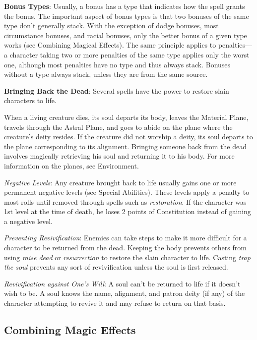 \textbf{Bonus Types}: Usually, a bonus has a type that indicates how the spell grants the bonus. The important aspect of bonus types is that two bonuses of the same type don't generally stack. With the exception of dodge bonuses, most circumstance bonuses, and racial bonuses, only the better bonus of a given type works (see Combining Magical Effects). The same principle applies to penalties---a character taking two or more penalties of the same type applies only the worst one, although most penalties have no type and thus always stack. Bonuses without a type always stack, unless they are from the same source.
				
\textbf{Bringing Back the Dead}: Several spells have the power to restore slain characters to life.
				
When a living creature dies, its soul departs its body, leaves the Material Plane, travels through the Astral Plane, and goes to abide on the plane where the creature's deity resides. If the creature did not worship a deity, its soul departs to the plane corresponding to its alignment. Bringing someone back from the dead involves magically retrieving his soul and returning it to his body. For more information on the planes, see Environment.
				
\textit{Negative Levels}: Any creature brought back to life usually gains one or more permanent negative levels (see Special Abilities). These levels apply a penalty to most rolls until removed through spells such as \textit{restoration}. If the character was 1st level at the time of death, he loses 2 points of Constitution instead of gaining a negative level.
				
\textit{Preventing Revivification}: Enemies can take steps to make it more difficult for a character to be returned from the dead. Keeping the body prevents others from using \textit{raise dead }or \textit{resurrection }to restore the slain character to life. Casting \textit{trap the soul }prevents any sort of revivification unless the soul is first released.
				
\textit{Revivification against One's Will}: A soul can't be returned to life if it doesn't wish to be. A soul knows the name, alignment, and patron deity (if any) of the character attempting to revive it and may refuse to return on that basis.
				
\subsection{Combining Magic Effects}


